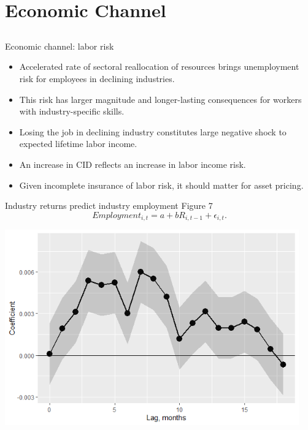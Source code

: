 \documentclass{beamer}
\begin{document}
\section{Economic Channel}
\subsection{}


\normalsize
\begin{frame}{Economic channel: labor risk}
\begin{itemize}
    \item {Accelerated rate of sectoral reallocation of resources brings unemployment risk for employees in declining industries.}
    \item {This risk has larger magnitude and longer-lasting consequences for workers with industry-specific skills.}
    \item {Losing the job in declining industry constitutes large negative shock to expected lifetime labor income.}
    \item {An increase in CID reflects an increase in labor income risk.}
    \item {Given incomplete insurance of labor risk, it should matter for asset pricing.}
\end{itemize}
\end{frame}



\begin{frame}{Industry returns predict industry employment}
{Figure 7}
\vspace{-0.4cm}
    $$Employment_{i,t} = a + b R_{i,t-1} + \epsilon_{i,t}.$$
\begin{center}
\includegraphics[width=0.95\textwidth]{paper_nov20/mPred_w.png}
\end{center}
\end{frame}
\end{document}
